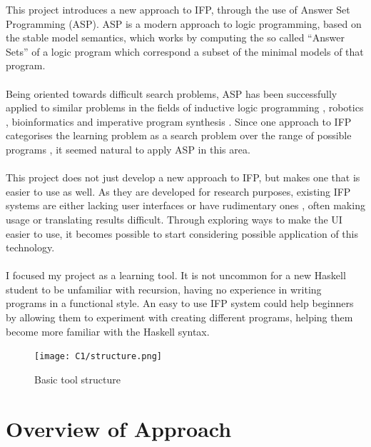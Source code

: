 This project introduces a new approach to IFP, through the use of Answer Set Programming (ASP). ASP \cite{Lifschitz1999} is a modern approach to logic programming, based on the stable model semantics, which works by computing the so called ``Answer Sets'' of a logic program which correspond a subset of the minimal models of that program. \\ \\
Being oriented towards difficult search problems, ASP has been successfully applied to similar problems in the fields of inductive logic programming \cite{Corapi2012}, robotics \cite{Yang}, bioinformatics \cite{Guziolowski2013} and imperative program synthesis \cite{Crowe2015}. Since one approach to IFP categorises the learning problem as a search problem over the range of possible programs \cite{Katayama2012}, it seemed natural to apply ASP in this area. \\ \\
This project does not just develop a new approach to IFP, but makes one that is easier to use as well. As they are developed for research purposes, existing IFP systems are either lacking user interfaces \cite{igordemo} or have rudimentary ones \cite{Katayama2013}, often making usage or translating results difficult. Through exploring ways to make the UI easier to use, it becomes possible to start considering possible application of this technology. \\ \\
I focused my project as a learning tool. It is not uncommon for a new Haskell student to be unfamiliar with recursion, having no experience in writing programs in a functional style. An easy to use IFP system could help beginners by allowing them to experiment with creating different programs, helping them become more familiar with the Haskell syntax.

\begin{figure}[h!]
\centering
\texttt{[image: C1/structure.png]}
\caption{Basic tool structure}
\label{fig:structure}
\end{figure}

\section{Overview of Approach}

